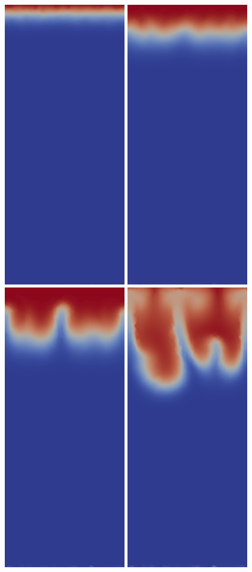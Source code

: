 \begin{figure}[H]
	\centering
	      \includegraphics[width=0.19\columnwidth]{./examples_images/tephra_settling/tephra_coarse_1.png}
	      \includegraphics[width=0.19\columnwidth]{./examples_images/tephra_settling/tephra_coarse_2.png}
	      \includegraphics[width=0.19\columnwidth]{./examples_images/tephra_settling/tephra_coarse_3.png}
	      \includegraphics[width=0.19\columnwidth]{./examples_images/tephra_settling/tephra_coarse_4.png}

\end{figure}
